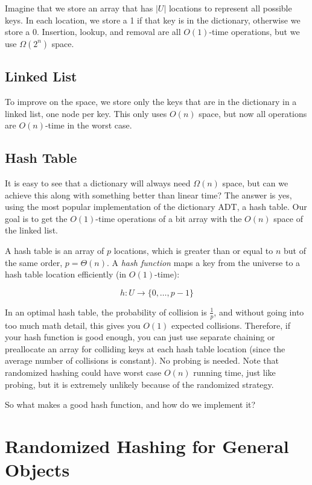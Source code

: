 \documentclass{article}[10pth]
\begin{document}
Imagine that we store an array that has $|U|$ locations to represent all
possible keys. In each location, we store a 1 if that key is in the
dictionary, otherwise we store a 0. Insertion, lookup, and removal are
all $O(1)$-time operations, but we use $\Omega(2^n)$ space.

\subsection{Linked List}

To improve on the space, we store only the keys that are in the dictionary
in a linked list, one node per key. This only uses $O(n)$ space, but now
all operations are $O(n)$-time in the worst case.

\subsection{Hash Table}

It is easy to see that a dictionary will always need $\Omega(n)$ space,
but can we achieve this along with something better than linear time?
The answer is yes, using the most popular implementation of the dictionary ADT,
a hash table. Our goal is to get the $O(1)$-time operations of a bit array
with the $O(n)$ space of the linked list.

A hash table is an array of $p$ locations, which is greater than or equal to
$n$ but of the same order, $p = \Theta(n)$.
A \textit{hash function} maps a key from the universe to a hash table
location efficiently (in $O(1)$-time):

\begin{equation}
h : U \rightarrow \{0, \ldots, p-1\}
\end{equation}

In an optimal hash table, the probability of collision is $\frac{1}{p}$,
and without going into too much math detail, this gives you $O(1)$ expected
collisions. Therefore, if your hash function is good enough, you can just
use separate chaining or preallocate an array for colliding keys at each
hash table location (since the average number of collisions is constant).
No probing is needed. Note that randomized hashing could have worst
case $O(n)$ running time, just like probing, but it is extremely unlikely
because of the randomized strategy.

So what makes a good hash function, and how do we implement it?

\section{Randomized Hashing for General Objects}
\end{document}
